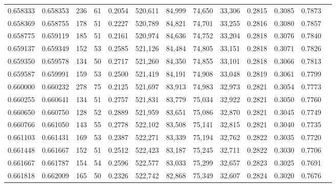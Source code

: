 \begin{tabular}{rrrrrrrrrrrrr}
0.658333 & 0.658353 &    236 &    61 &                                     0.2054 & 520,611 &  84,999 &  74,650 &  33,306 & 0.2815 & 0.3085 & 0.7873 \\
0.658369 & 0.658755 &    178 &    51 &                                     0.2227 & 520,789 &  84,821 &  74,701 &  33,255 & 0.2816 & 0.3080 & 0.7857 \\
0.658775 & 0.659119 &    185 &    51 &                                     0.2161 & 520,974 &  84,636 &  74,752 &  33,204 & 0.2818 & 0.3076 & 0.7840 \\
0.659137 & 0.659349 &    152 &    53 &                                     0.2585 & 521,126 &  84,484 &  74,805 &  33,151 & 0.2818 & 0.3071 & 0.7826 \\
0.659350 & 0.659578 &    134 &    50 &                                     0.2717 & 521,260 &  84,350 &  74,855 &  33,101 & 0.2818 & 0.3066 & 0.7813 \\
0.659587 & 0.659991 &    159 &    53 &                                     0.2500 & 521,419 &  84,191 &  74,908 &  33,048 & 0.2819 & 0.3061 & 0.7799 \\
0.660000 & 0.660232 &    278 &    75 &                                     0.2125 & 521,697 &  83,913 &  74,983 &  32,973 & 0.2821 & 0.3054 & 0.7773 \\
0.660255 & 0.660641 &    134 &    51 &                                     0.2757 & 521,831 &  83,779 &  75,034 &  32,922 & 0.2821 & 0.3050 & 0.7760 \\
0.660650 & 0.660750 &    128 &    52 &                                     0.2889 & 521,959 &  83,651 &  75,086 &  32,870 & 0.2821 & 0.3045 & 0.7749 \\
0.660766 & 0.661050 &    143 &    55 &                                     0.2778 & 522,102 &  83,508 &  75,141 &  32,815 & 0.2821 & 0.3040 & 0.7735 \\
0.661103 & 0.661431 &    169 &    53 &                                     0.2387 & 522,271 &  83,339 &  75,194 &  32,762 & 0.2822 & 0.3035 & 0.7720 \\
0.661448 & 0.661667 &    152 &    51 &                                     0.2512 & 522,423 &  83,187 &  75,245 &  32,711 & 0.2822 & 0.3030 & 0.7706 \\
0.661667 & 0.661787 &    154 &    54 &                                     0.2596 & 522,577 &  83,033 &  75,299 &  32,657 & 0.2823 & 0.3025 & 0.7691 \\
0.661818 & 0.662009 &    165 &    50 &                                     0.2326 & 522,742 &  82,868 &  75,349 &  32,607 & 0.2824 & 0.3020 & 0.7676 \\

\end{tabular}

